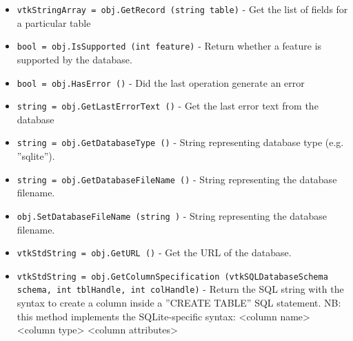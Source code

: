 \begin{itemize}
\item  \verb|vtkStringArray = obj.GetRecord (string table)| -  Get the list of fields for a particular table

\item  \verb|bool = obj.IsSupported (int feature)| -  Return whether a feature is supported by the database.

\item  \verb|bool = obj.HasError ()| -  Did the last operation generate an error

\item  \verb|string = obj.GetLastErrorText ()| -  Get the last error text from the database

\item  \verb|string = obj.GetDatabaseType ()| -  String representing database type (e.g. ''sqlite'').

\item  \verb|string = obj.GetDatabaseFileName ()| -  String representing the database filename.

\item  \verb|obj.SetDatabaseFileName (string )| -  String representing the database filename.

\item  \verb|vtkStdString = obj.GetURL ()| -  Get the URL of the database.

\item  \verb|vtkStdString = obj.GetColumnSpecification (vtkSQLDatabaseSchema schema, int tblHandle, int colHandle)| -  Return the SQL string with the syntax to create a column inside a
 ''CREATE TABLE'' SQL statement.
 NB: this method implements the SQLite-specific syntax:
 <column name> <column type> <column attributes>

\end{itemize}
